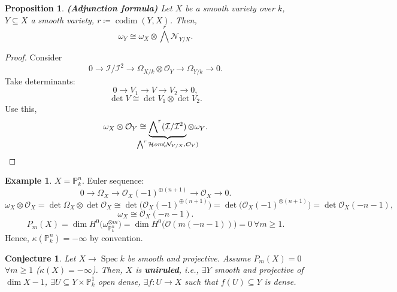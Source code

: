 \documentclass[12pt]{article}
\DeclareMathOperator{\Spec}{Spec}
\DeclareMathOperator{\shHom}{\mathcal{H}\textit{om}}
\DeclareMathOperator{\codim}{codim}
\newtheorem*{proposition}{Proposition}
\newtheorem*{conjecture}{Conjecture}
\theoremstyle{definition}
\newtheorem*{example}{Example}
\theoremstyle{remark}
\newtheorem*{comment}{Comment}
\begin{document}
\begin{comment}
$\mathcal{T}_{Y/k}$ is like the tangent space of the subvariety and $\mathcal{N}_{Y/X}$ is like the normal space. One would expect that the total space was the direct sum of $\mathcal{T}_{Y/k}$ and $\mathcal{N}_{Y/X}$, but this is not always like that. Nevertheless, at least we have the exact sequence, which is a weaker version of a direct sum.
\end{comment}

\begin{proposition}
\emph{\textbf{(Adjunction formula)}} Let $X$ be a smooth variety over $k$, $Y\subseteq X$ a smooth variety, $r\coloneqq\codim(Y,X)$. Then,
\[\omega_Y\cong\omega_X\otimes{\bigwedge}^r\mathcal{N}_{Y/X}.\]
\end{proposition}

\begin{proof}
Consider
\[0\longrightarrow\mathcal{I}/\mathcal{I}^2\longrightarrow\Omega_{X/k}\otimes\mathcal{O}_Y\longrightarrow\Omega_{Y/k}\longrightarrow0.\]
Take determinants:
\[0\longrightarrow V_1\longrightarrow V\longrightarrow V_2\longrightarrow0,\]
\[\det V\cong\det V_1\otimes\det V_2.\]
Use this,
\[\omega_X\otimes\mathcal{O}_Y\cong\underbrace{{\bigwedge}^r(\mathcal{I}/\mathcal{I}^2)}_{\mathclap{{\bigwedge}^r\shHom(\mathcal{N}_{Y/X},\mathcal{O}_Y)}}\otimes\omega_Y.\]
\end{proof}

\begin{example}
$X=\mathbb{P}_k^n$. Euler sequence:
\[0\longrightarrow\Omega_X\longrightarrow\mathcal{O}_X(-1)^{\oplus(n+1)}\longrightarrow\mathcal{O}_X\longrightarrow0.\]
\[\omega_X\otimes\mathcal{O}_X=\det\Omega_X\otimes\det\mathcal{O}_X\cong\det\big(\mathcal{O}_X(-1)^{\oplus(n+1)}\big)=\det\big(\mathcal{O}_X(-1)^{\otimes(n+1)}\big)=\det\mathcal{O}_X(-n-1),\]
\[\omega_X\cong\mathcal{O}_X(-n-1).\]
\[P_m(X)=\dim H^0\big(\omega_{\mathbb{P}_k^n}^{\otimes m}\big)=\dim H^0\big(\mathcal{O}(m(-n-1))\big)=0\ \forall m\geq1.\]
Hence, $\kappa(\mathbb{P}_k^n)=-\infty$ by convention.
\end{example}

\begin{conjecture}
Let $X\rightarrow\Spec k$ be smooth and projective. Assume $P_m(X)=0$ $\forall m\geq1$ ($\kappa(X)=-\infty$). Then, $X$ is \textbf{uniruled}, i.e., $\exists Y$ smooth and projective of $\dim X-1$, $\exists U\subseteq Y\times\mathbb{P}_k^1$ open dense, $\exists f:U\rightarrow X$ such that $f(U)\subseteq Y$ is dense.
\end{conjecture}
\end{document}
